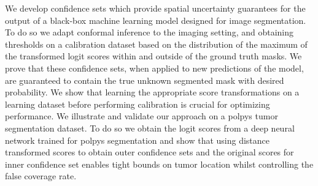 We develop confidence sets which provide spatial uncertainty guarantees for the output of a black-box machine learning model designed for image segmentation. To do so we adapt conformal inference to the imaging setting, and obtaining thresholds on a calibration dataset based on the distribution of the maximum of the transformed logit scores within and outside of the ground truth masks. We prove that these confidence sets, when applied to new predictions of the model, are guaranteed to contain the true unknown segmented mask with desired probability. We show that learning the appropriate score transformations on a learning dataset before performing calibration is crucial for optimizing performance. We illustrate and validate our approach on a polpys tumor segmentation dataset. To do so we obtain the logit scores from a deep neural network trained for polpys segmentation and show that using distance transformed scores to obtain outer confidence sets and the original scores for inner confidence set enables tight bounds on tumor location whilst controlling the false coverage rate. 
